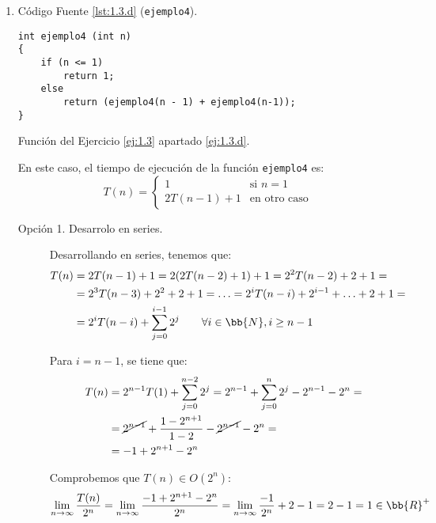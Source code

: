 \begin{ejercicio}
\begin{enumerate}
        \item \label{ej:1.3.d} Código Fuente \ref{lst:1.3.d} (\verb|ejemplo4|).
        \begin{listing}[H]
            \begin{verbatim}
int ejemplo4 (int n)
{
    if (n <= 1)
        return 1;
    else
        return (ejemplo4(n - 1) + ejemplo4(n-1));
}
            \end{verbatim}
            \caption{Función del Ejercicio \ref{ej:1.3} apartado \ref{ej:1.3.d}.}
            \label{lst:1.3.d}
        \end{listing}

        En este caso, el tiempo de ejecución de la función \verb|ejemplo4| es:
        \begin{equation*}
            T(n) = \left\{\begin{array}{ll}
                1 & \text{si } n = 1 \\
                2T(n-1)+1 & \text{en otro caso}
            \end{array}\right.
        \end{equation*}
    
        \begin{description}
            \item[Opción 1. Desarrolo en series.] 
                
            Desarrollando en series, tenemos que:
            \begin{align*}
                T(n) &= 2T(n-1)+1 = 2(2T(n-2)+1)+1 = 2^2T(n-2)+2+1 =\\
                &= 2^3T(n-3)+2^2+2+1 = \ldots = 2^iT(n-i)+2^{i-1}+\ldots+2+1 =\\
                &= 2^iT(n-i)+\sum_{j=0}^{i-1} 2^j \qquad \forall i\in \bb{N}, i\geq {n-1}
            \end{align*}

            Para $i=n-1$, se tiene que:
            \begin{align*}
                T(n) &= 2^{n-1}T(1)+\sum_{j=0}^{n-2} 2^j
                = 2^{n-1}+\sum_{j=0}^{n} 2^j - 2^{n-1} - 2^n
                =\\&= \cancel{2^{n-1}}+\frac{1-2^{n+1}}{1-2} - \cancel{2^{n-1}} - 2^n
                =\\&= -1 + 2^{n+1} - 2^n
            \end{align*}

            Comprobemos que $T(n)\in O(2^n)$:
            \begin{equation*}
                \lim_{n\to \infty} \frac{T(n)}{2^n}
                = \lim_{n\to \infty} \frac{-1 + 2^{n+1} - 2^n}{2^n}
                = \lim_{n\to \infty} \frac{-1}{2^n} + 2 - 1 = 2 - 1 = 1 \in \bb{R}^+
            \end{equation*}


\end{description}
\end{enumerate}
\end{ejercicio}
